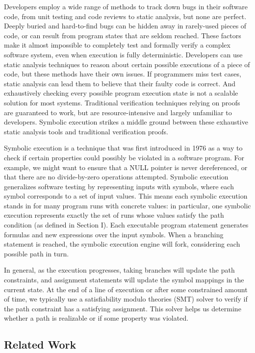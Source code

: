 \documentclass[11pt,conference]{IEEEtran}
\begin{document}
Developers employ a wide range of methods to track down bugs in their software code, from unit testing and code reviews to static analysis, but none are perfect. Deeply buried and hard-to-find bugs can be hidden away in rarely-used pieces of code, or can result from program states that are seldom reached. These factors make it almost impossible to completely test and formally verify a complex software system, even when execution is fully deterministic. Developers can use static analysis techniques to reason about certain possible executions of a piece of code, but these methods have their own issues. If programmers miss test cases, static analysis can lead them to believe that their faulty code is correct. And exhaustively checking every possible program execution state is not a scalable solution for most systems. Traditional verification techniques relying on proofs are guaranteed to work, but are resource-intensive and largely unfamiliar to developers. Symbolic execution strikes a middle ground between these exhaustive static analysis tools and traditional verification proofs. 

Symbolic execution is a technique that was first introduced in 1976 as a way to check if certain properties could possibly be violated in a software program. For example, we might want to ensure that a NULL pointer is never dereferenced, or that there are no divide-by-zero operations attempted. Symbolic execution generalizes software testing by representing inputs with symbols, where each symbol corresponds to a set of input values. This means each symbolic execution stands in for many program runs with concrete values: in particular, one symbolic execution represents exactly the set of runs whose values satisfy the path condition (as defined in Section I). Each executable program statement generates formulas and new expressions over the input symbols. When a branching statement is reached, the symbolic execution engine will fork, considering each possible path in turn.

In general, as the execution progresses, taking branches will update the path constraints, and assignment statements will update the symbol mappings in the current state. At the end of a line of execution or after some constrained amount of time, we typically use a satisfiability modulo theories (SMT) solver to verify if the path constraint has a satisfying assignment. This solver helps us determine whether a path is realizable or if some property was violated.

\subsection{Related Work}
\end{document}

